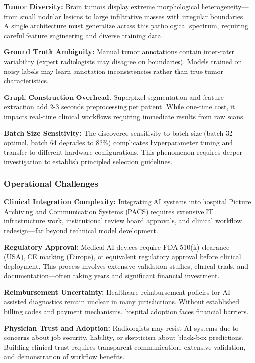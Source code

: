 \textbf{Tumor Diversity:} Brain tumors display extreme morphological heterogeneity—from small nodular lesions to large infiltrative masses with irregular boundaries. A single architecture must generalize across this pathological spectrum, requiring careful feature engineering and diverse training data.

\textbf{Ground Truth Ambiguity:} Manual tumor annotations contain inter-rater variability (expert radiologists may disagree on boundaries). Models trained on noisy labels may learn annotation inconsistencies rather than true tumor characteristics.

\textbf{Graph Construction Overhead:} Superpixel segmentation and feature extraction add 2-3 seconds preprocessing per patient. While one-time cost, it impacts real-time clinical workflows requiring immediate results from raw scans.

\textbf{Batch Size Sensitivity:} The discovered sensitivity to batch size (batch 32 optimal, batch 64 degrades to 83\%) complicates hyperparameter tuning and transfer to different hardware configurations. This phenomenon requires deeper investigation to establish principled selection guidelines.

\subsubsection{Operational Challenges}

\textbf{Clinical Integration Complexity:} Integrating AI systems into hospital Picture Archiving and Communication Systems (PACS) requires extensive IT infrastructure work, institutional review board approvals, and clinical workflow redesign—far beyond technical model development.

\textbf{Regulatory Approval:} Medical AI devices require FDA 510(k) clearance (USA), CE marking (Europe), or equivalent regulatory approval before clinical deployment. This process involves extensive validation studies, clinical trials, and documentation—often taking years and significant financial investment.

\textbf{Reimbursement Uncertainty:} Healthcare reimbursement policies for AI-assisted diagnostics remain unclear in many jurisdictions. Without established billing codes and payment mechanisms, hospital adoption faces financial barriers.

\textbf{Physician Trust and Adoption:} Radiologists may resist AI systems due to concerns about job security, liability, or skepticism about black-box predictions. Building clinical trust requires transparent communication, extensive validation, and demonstration of workflow benefits.

